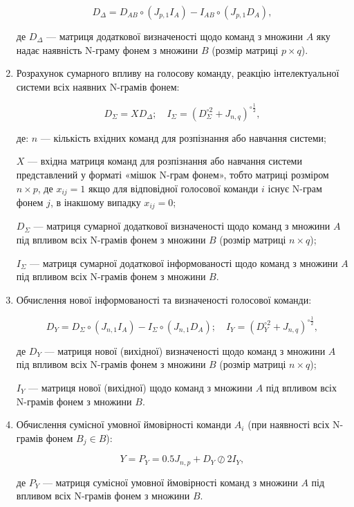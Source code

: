 \begin{enumerate}
	\[
	D_\Delta=D_{AB} \circ (J_{p,1}I_A)-I_{AB} \circ (J_{p,1}D_A),
	\]
	
	де $D_\Delta$ --- матриця додаткової визначеності щодо команд з множини $A$ яку надає наявність N-граму фонем з множини $B$ (розмір матриці $p\times q$).
	
	\item Розрахунок сумарного впливу на голосову команду, реакцію інтелектуальної системи всіх наявних N-грамів фонем:
	
	\[
	D_\Sigma = XD_\Delta;\quad I_\Sigma=(D_\Sigma^{\circ 2}+J_{n,q})^{\circ \frac{1}{2}},
	\]
	
	де: $n$ --- кількість вхідних команд для розпізнання або навчання системи; 
	
	{\settowidth{\leftskip}{де:\ }
		
		$X$ --- вхідна матриця команд для розпізнання або навчання системи представлений у форматі «мішок N-грам фонем», тобто матриці розміром $n \times p$, де $x_{ij}=1$ якщо для відповідної голосової команди $i$ існує N-грам фонем $j$, в інакшому випадку $x_{ij}=0$;
	
		$D_\Sigma$ --- матриця сумарної додаткової визначеності щодо команд  з множини $A$ під впливом всіх N-грамів фонем з множини $B$ (розмір матриці $n\times q$);
		
		$I_\Sigma$ --- матриця сумарної додаткової інформованості щодо команд  з множини $A$ під впливом всіх N-грамів фонем з множини $B$.
		
	}
	
	\item Обчислення нової інформованості та визначеності голосової команди:
	
	\[
	D_Y=D_\Sigma \circ (J_{n,1}I_A) - I_\Sigma \circ (J_{n,1}D_A);\quad I_Y=(D_Y^{\circ 2}+J_{n,q})^{\circ \frac{1}{2}},
	\]
	
	де $D_Y$ --- матриця нової (вихідної) визначеності щодо команд  з множини $A$ під впливом всіх N-грамів фонем з множини $B$ (розмір матриці $n\times q$); 
	
	$I_Y$ --- матриця нової (вихідної) щодо команд з множини $A$ під впливом всіх N-грамів фонем з множини $B$.
	
	\item Обчислення сумісної умовної ймовірності команди $A_i$ (при наявності всіх N-грамів фонем $B_j \in B$):
	
	\[
	Y=P_Y=0.5J_{n,p}+D_Y \oslash 2I_Y,
	\]
	
	де $P_Y$ --- матриця сумісної умовної ймовірності команд з множини $A$ під впливом всіх N-грамів фонем з множини $B$.
\end{enumerate}

